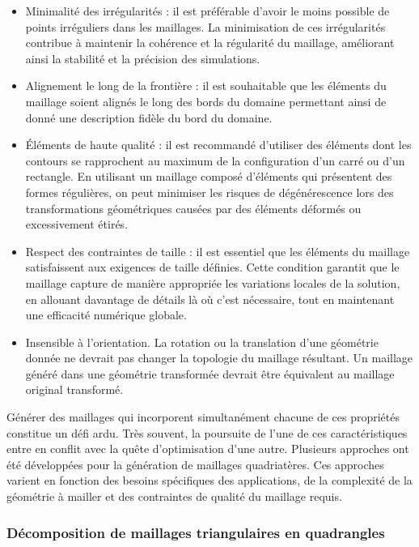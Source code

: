 \begin{itemize}
    \item Minimalité des irrégularités : il est préférable d'avoir le moins possible de points irréguliers dans les maillages. La minimisation de ces irrégularités contribue à maintenir la cohérence et la régularité du maillage, améliorant ainsi la stabilité et la précision des simulations.\\
    \item Alignement le long de la frontière : il est souhaitable que les éléments du maillage soient alignés le long des bords du domaine permettant ainsi de donné une description fidèle du bord du domaine.\\
    \item Éléments de haute qualité : il est recommandé d'utiliser des éléments dont les contours se rapprochent au maximum de la configuration d'un carré ou d'un rectangle. En utilisant un maillage composé d'éléments qui présentent des formes régulières, on peut minimiser les risques de dégénérescence lors des transformations géométriques causées par des éléments déformés ou excessivement étirés.\\
    \item Respect des contraintes de taille : il est essentiel que les éléments du maillage satisfaissent aux exigences de taille définies. Cette condition garantit que le maillage capture de manière appropriée les variations locales de la solution, en allouant davantage de détails là où c'est nécessaire, tout en maintenant une efficacité numérique globale.\\
    \item Insensible à l'orientation. La rotation ou la translation d'une géométrie donnée ne devrait pas changer la topologie du maillage résultant. Un maillage généré dans une géométrie transformée devrait être équivalent au maillage original transformé.\\
\end{itemize}

Générer des maillages qui incorporent simultanément chacune de ces propriétés constitue un défi ardu. Très souvent, la poursuite de l'une de ces caractéristiques entre en conflit avec la quête d'optimisation d'une autre. Plusieurs approches ont été développées pour la génération de maillages quadriatères. Ces approches varient en fonction des besoins spécifiques des applications, de la complexité de la géométrie à mailler et des contraintes de qualité du maillage requis. 

\subsubsection{Décomposition de maillages triangulaires en quadrangles}

